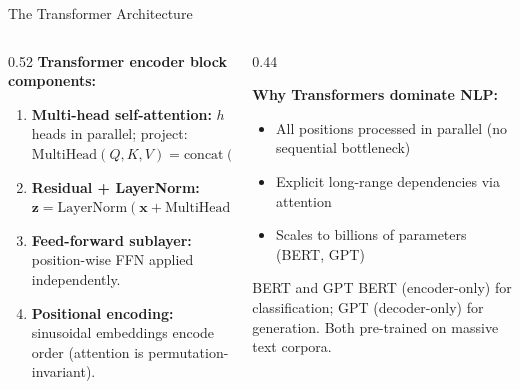 \documentclass[aspectratio=169, 11pt]{beamer}
\begin{document}
\begin{frame}{The Transformer Architecture}
  \begin{columns}[T]
    \begin{column}{0.52\textwidth}
      \textbf{Transformer encoder block components:}
      \begin{enumerate}\footnotesize
        \item \textbf{Multi-head self-attention:}
              $h$ heads in parallel; project:
              $\text{MultiHead}(Q,K,V) = \text{concat}(\text{head}_1,\ldots,\text{head}_h)W^O$
        \item \textbf{Residual + LayerNorm:}
              $\mathbf{z} = \text{LayerNorm}(\mathbf{x} + \text{MultiHead}(\mathbf{x}))$
        \item \textbf{Feed-forward sublayer:}
              position-wise FFN applied independently.
        \item \textbf{Positional encoding:}
              sinusoidal embeddings encode order
              (attention is permutation-invariant).
      \end{enumerate}
    \end{column}
    \begin{column}{0.44\textwidth}
      \begin{keybox}
        \small
        \textbf{Why Transformers dominate NLP:}
        \begin{itemize}\footnotesize
          \item All positions processed in parallel (no sequential bottleneck)
          \item Explicit long-range dependencies via attention
          \item Scales to billions of parameters (BERT, GPT)
        \end{itemize}
      \end{keybox}
      \vspace{0.1cm}
      \begin{examplebox}{BERT and GPT}
        \small BERT \parencite{Devlin2019} (encoder-only) for
        classification; GPT (decoder-only) for generation.
        Both pre-trained on massive text corpora.
      \end{examplebox}
    \end{column}
  \end{columns}
\end{frame}
\end{document}
